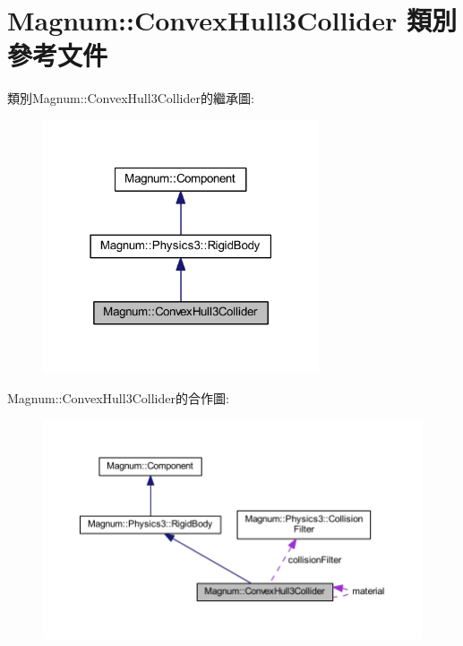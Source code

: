 \hypertarget{class_magnum_1_1_convex_hull3_collider}{}\section{Magnum\+:\+:Convex\+Hull3\+Collider 類別 參考文件}
\label{class_magnum_1_1_convex_hull3_collider}


類別\+Magnum\+:\+:Convex\+Hull3\+Collider的繼承圖\+:\nopagebreak
\begin{figure}[H]
\begin{center}
\leavevmode
\includegraphics[width=231pt]{class_magnum_1_1_convex_hull3_collider__inherit__graph}
\end{center}
\end{figure}


Magnum\+:\+:Convex\+Hull3\+Collider的合作圖\+:\nopagebreak
\begin{figure}[H]
\begin{center}
\leavevmode
\includegraphics[width=350pt]{class_magnum_1_1_convex_hull3_collider__coll__graph}
\end{center}
\end{figure}
